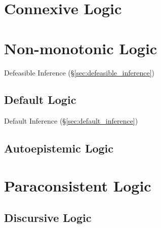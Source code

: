 \section{Connexive Logic}\label{sec:connexive_logic}



\section{Non-monotonic Logic}\label{sec:nonmonotonic_logic}

Defeasible Inference (\S\ref{sec:defeasible_inference})



\subsection{Default Logic}\label{sec:default_logic}

Default Inference (\S\ref{sec:default_inference})



\subsection{Autoepistemic Logic}\label{sec:autoepistemic_logic}



\section{Paraconsistent Logic}\label{sec:paraconsistent_logic}

\subsection{Discursive Logic}\label{sec:discursive_logic}

